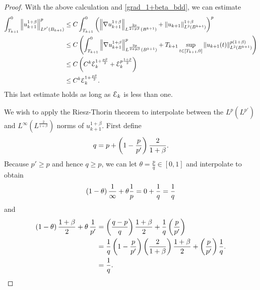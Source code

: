 \begin{proof}
With the above calculation and \eqref{grad_1+beta_bdd}, we can estimate
\begin{align*} 
\int_{T_{k+1}}^0 \left\lVert u_{k+1}^{1+\beta}\right\rVert_{L^{p'}(B_{k+1})}^p &\leq C \int_{T_{k+1}}^0 \left( \left\lVert\nabla u_{k+1}^{1+\beta}\right\rVert_{L^\frac{2p}{2+p\beta}(B^{k+1})} + \left\lVert u_{k+1}\right\rVert_{L^2(B^{k+1})}^{1+\beta} \right)^p
\\ &\leq C \left(  \int_{T_{k+1}}^0 \left\lVert\nabla u_{k+1}^{1+\beta}\right\rVert_{L^\frac{2p}{2+p\beta}(B^{k+1})}^p + T_{k+1} \sup_{t\in [T_{k+1},0]} \left\lVert u_{k+1}(t)\right\rVert_{L^2(B^{k+1})}^{p(1+\beta)} \right)
\\ &\leq C \left( C^k \mathcal{E}_k^{1+\frac{p\beta}{2}} + \mathcal{E}_k^{p\frac{1+\beta}{2}} \right)
\\ &\leq C^k \mathcal{E}_k^{1 + \frac{p\beta}{2}}.
\end{align*}
This last estimate holds as long as $\mathcal{E}_k$ is less than one.  

We wish to apply the Riesz-Thorin theorem to interpolate between the $L^p(L^{p'})$ and $L^\infty(L^\frac{2}{1+\beta})$ norms of $u_{k+1}^{1+\beta}$.  First define
\begin{equation}\label{def_of_q} q = p + \left( 1 - \frac{p}{p'} \right)\frac{2}{1+\beta}. \end{equation}
Because $p' \geq p$ and hence $q \geq p$, we can let $\theta = \frac{p}{q} \in [0,1]$ and interpolate to obtain
\[ \left( 1-\theta \right) \frac{1}{\infty} + \theta \frac{1}{p} 
= 0 + \frac{1}{q} 
= \frac{1}{q} \]
and
\begin{align*} 
\left( 1-\theta \right) \frac{1+\beta}{2} + \theta \, \frac{1}{p'} 
&= \left( \frac{q-p}{q} \right) \frac{1+\beta}{2} + \frac{1}{q} \left( \frac{p}{p'} \right) 
\\ &= \frac{1}{q} \left( 1 -  \frac{p}{p'} \right) \left( \frac{2}{1+\beta} \right) \frac{1+\beta}{2} + \left( \frac{p}{p'} \right) \frac{1}{q}.
\\ &= \frac{1}{q}. 
\end{align*}


\end{proof}
